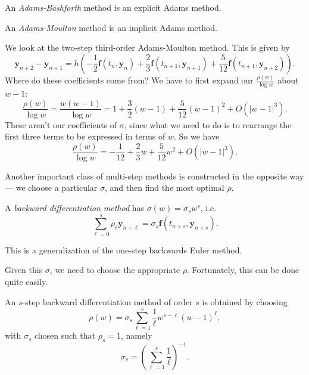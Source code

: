 \documentclass[a4paper]{article}
\begin{document}
\begin{defi}
  An \emph{Adams-Bashforth} method is an explicit Adams method.
\end{defi}

\begin{defi}
  An \emph{Adams-Moulton} method is an implicit Adams method.
\end{defi}

\begin{eg}
  We look at the two-step third-order Adams-Moulton method. This is given by
  \[
    \mathbf{y}_{n + 2} - \mathbf{y}_{n + 1} = h \left(-\frac{1}{2} \mathbf{f}(t_n, \mathbf{y}_n) + \frac{2}{3} \mathbf{f}(t_{n + 1}, \mathbf{y}_{n + 1}) + \frac{5}{12} \mathbf{f}(t_{n + 1}, \mathbf{y}_{n + 2})\right).
  \]
  Where do these coefficients come from? We have to first expand our $\frac{\rho(w)}{\log w}$ about $w - 1$:
  \[
    \frac{\rho(w)}{\log w} = \frac{w(w - 1)}{\log w} = 1 + \frac{3}{2} (w - 1) + \frac{5}{12}(w - 1)^2 + O(|w - 1|^3).
  \]
  These aren't our coefficients of $\sigma$, since what we need to do is to rearrange the first three terms to be expressed in terms of $w$. So we have
  \[
    \frac{\rho(w)}{\log w} = -\frac{1}{12} + \frac{2}{3} w + \frac{5}{12}w^2 + O(|w - 1|^3).
  \]
\end{eg}

Another important class of multi-step methods is constructed in the opposite way --- we choose a particular $\sigma$, and then find the most optimal $\rho$.

\begin{defi}
  A \emph{backward differentiation method} has $\sigma (w) = \sigma_s w^s$, i.e.
  \[
    \sum_{\ell = 0}^s \rho_\ell \mathbf{y}_{n + \ell} = \sigma_s \mathbf{f}(t_{n + s}, \mathbf{y}_{n + s}).
  \]
\end{defi}
This is a generalization of the one-step backwards Euler method.

Given this $\sigma$, we need to choose the appropriate $\rho$. Fortunately, this can be done quite easily.
\begin{lemma}
  An $s$-step backward differentiation method of order $s$ is obtained by choosing
  \[
    \rho(w) = \sigma_s \sum_{\ell = 1}^s \frac{1}{\ell} w^{s - \ell}(w - 1)^\ell,
  \]
  with $\sigma_s$ chosen such that $\rho_s = 1$, namely
  \[
    \sigma_s = \left(\sum_{\ell = 1}^s \frac{1}{\ell}\right)^{-1}.
  \]
\end{lemma}
\end{document}
